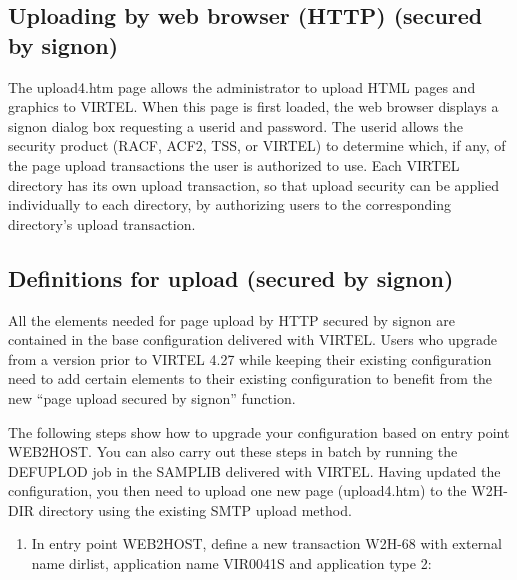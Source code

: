 \documentclass[letterpaper,10pt,english]{sphinxmanual}
\begin{document}
\subsection{Uploading by web browser (HTTP) (secured by signon)}
\label{\detokenize{audit_operations_ and_performance:uploading-by-web-browser-http-secured-by-signon}}\label{\detokenize{audit_operations_ and_performance:index-56}}
The upload4.htm page allows the administrator to upload HTML pages and graphics to VIRTEL. When this page is first loaded, the web browser displays a signon dialog box requesting a userid and password. The userid allows the security product (RACF, ACF2, TSS, or VIRTEL) to determine which, if any, of the page upload transactions the user is authorized to use. Each VIRTEL directory has its own upload transaction, so that upload security can be applied individually to each directory, by authorizing users to the corresponding directory’s upload transaction.

\ignorespaces 

\subsection{Definitions for upload (secured by signon)}
\label{\detokenize{audit_operations_ and_performance:definitions-for-upload-secured-by-signon}}\label{\detokenize{audit_operations_ and_performance:index-57}}
All the elements needed for page upload by HTTP secured by signon are contained in the base configuration delivered with VIRTEL. Users who upgrade from a version prior to VIRTEL 4.27 while keeping their existing configuration need to add certain elements to their existing configuration to benefit from the new “page upload secured by signon” function.

The following steps show how to upgrade your configuration based on entry point WEB2HOST. You can also carry out these steps in batch by running the DEFUPLOD job in the SAMPLIB delivered with VIRTEL. Having updated the configuration, you then need to upload one new page (upload4.htm) to the W2H-DIR directory using the existing SMTP upload method.
\begin{enumerate}
\def\theenumi{\arabic{enumi}}
\def\labelenumi{\theenumi .}
\makeatletter\def\p@enumii{\p@enumi \theenumi .}\makeatother
\item {} 
In entry point WEB2HOST, define a new transaction W2H-68 with external name dirlist, application name VIR0041S and application type 2:

\end{enumerate}
\end{document}
